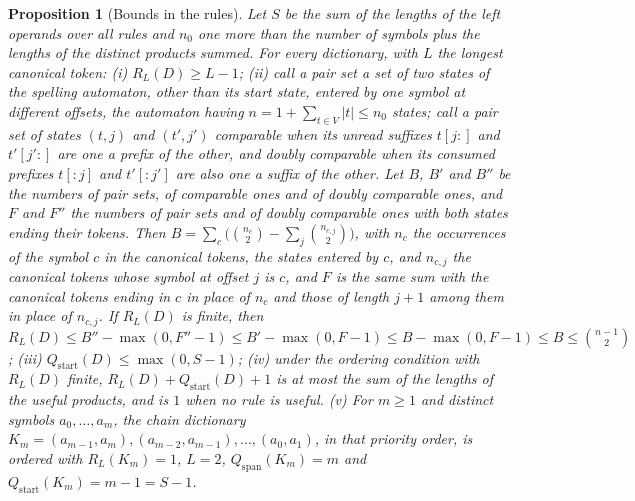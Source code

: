 \documentclass[11pt,a4paper]{article}
\theoremstyle{definition}
\theoremstyle{plain}
\newtheorem{proposition}{Proposition}
\newcommand{\ripple}{R_{L}}
\begin{document}
\begin{proposition}[Bounds in the rules]\label{prop:radiibounds}
Let \(S\) be the sum of the lengths of the left operands over all rules and \(n_0\) one more than the number of symbols
plus the lengths of the distinct products summed. For every dictionary, with \(L\) the longest canonical token: (i)
\(\ripple(D) \ge L - 1\); (ii) call a \emph{pair set} a set of two states of the spelling automaton, other than its
start state, entered by one symbol at different offsets, the automaton having \(n = 1 + \sum_{t \in V} |t| \le n_0\)
states; call a pair set of states \((t, j)\) and \((t', j')\) \emph{comparable} when its unread suffixes \(t[j{:}]\) and
\(t'[j'{:}]\) are one a prefix of the other, and \emph{doubly comparable} when its consumed prefixes \(t[{:}j]\) and
\(t'[{:}j']\) are also one a suffix of the other. Let \(B\), \(B'\) and \(B''\) be the numbers of pair sets, of
comparable ones and of doubly comparable ones, and \(F\) and \(F''\) the numbers of pair sets and of doubly comparable
ones with both states ending their tokens. Then
\(B = \sum_{c} \bigl(\binom{n_c}{2} - \sum_{j} \binom{n_{c,j}}{2}\bigr)\), with \(n_c\) the occurrences of the symbol
\(c\) in the canonical tokens, the states entered by \(c\), and \(n_{c,j}\) the canonical tokens whose symbol at offset
\(j\) is \(c\), and \(F\) is the same sum with the canonical tokens ending in \(c\) in place of \(n_c\) and those of
length \(j + 1\) among them in place of \(n_{c,j}\). If \(\ripple(D)\) is finite, then
\(\ripple(D) \le B'' - \max(0, F'' - 1) \le B' - \max(0, F - 1) \le B - \max(0, F - 1) \le B \le \binom{n - 1}{2}\);
(iii) \(Q_{\mathrm{start}}(D) \le \max(0, S - 1)\); (iv) under the ordering condition with \(\ripple(D)\) finite,
\(\ripple(D) + Q_{\mathrm{start}}(D) + 1\) is at most the sum of the lengths of the useful products, and is \(1\) when
no rule is useful. (v) For \(m \ge 1\) and distinct symbols \(a_0, \dots, a_m\), the chain dictionary
\(K_m = (a_{m-1}, a_m), (a_{m-2}, a_{m-1}), \dots, (a_0, a_1)\), in that priority order, is ordered with
\(\ripple(K_m) = 1\), \(L = 2\), \(Q_{\mathrm{span}}(K_m) = m\) and \(Q_{\mathrm{start}}(K_m) = m - 1 = S - 1\).
\end{proposition}
\end{document}
